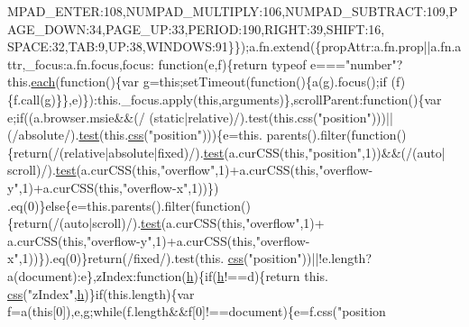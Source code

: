 \begin{DoxyCode}
      MPAD\_ENTER:108,NUMPAD\_MULTIPLY:106,NUMPAD\_SUBTRACT:109,PAGE\_DOWN:34,PAGE\_UP:33,PERIOD:190,RIGHT:39,SHIFT:16,
      SPACE:32,TAB:9,UP:38,WINDOWS:91\}\});a.fn.extend(\{propAttr:a.fn.prop||a.fn.attr,\_focus:a.fn.focus,focus:\textcolor{keyword}{
      function}(e,f)\{\textcolor{keywordflow}{return} typeof e===\textcolor{stringliteral}{"number"}?this.\hyperlink{jquery_8js_a871ff39db627c54c710a3e9909b8234c}{each}(\textcolor{keyword}{function}()\{var g=\textcolor{keyword}{this};setTimeout(\textcolor{keyword}{function}()\{a(g).focus();\textcolor{keywordflow}{if}
      (f)\{f.call(g)\}\},e)\}):this.\_focus.apply(\textcolor{keyword}{this},arguments)\},scrollParent:\textcolor{keyword}{function}()\{var e;\textcolor{keywordflow}{if}((a.browser.msie&&(/
      (\textcolor{keyword}{static}|relative)/).test(\textcolor{keyword}{this}.css(\textcolor{stringliteral}{"position"})))||(/absolute/).\hyperlink{inv__mpu_8c_a1e8f8b1ef7fb2c429e1ce7c2f9985530}{test}(this.\hyperlink{jquery_8js_a89ad527fcd82c01ebb587332f5b4fcd4}{css}(\textcolor{stringliteral}{"position"})))\{e=this.
      parents().filter(\textcolor{keyword}{function}()\{\textcolor{keywordflow}{return}(/(relative|absolute|fixed)/).\hyperlink{inv__mpu_8c_a1e8f8b1ef7fb2c429e1ce7c2f9985530}{test}(a.curCSS(\textcolor{keyword}{this},\textcolor{stringliteral}{"position"},1))&&(/(\textcolor{keyword}{auto}|
      scroll)/).\hyperlink{inv__mpu_8c_a1e8f8b1ef7fb2c429e1ce7c2f9985530}{test}(a.curCSS(\textcolor{keyword}{this},\textcolor{stringliteral}{"overflow"},1)+a.curCSS(\textcolor{keyword}{this},\textcolor{stringliteral}{"overflow-y"},1)+a.curCSS(\textcolor{keyword}{this},\textcolor{stringliteral}{"overflow-x"},1))\})
      .eq(0)\}\textcolor{keywordflow}{else}\{e=this.parents().filter(\textcolor{keyword}{function}()\{\textcolor{keywordflow}{return}(/(\textcolor{keyword}{auto}|scroll)/).\hyperlink{inv__mpu_8c_a1e8f8b1ef7fb2c429e1ce7c2f9985530}{test}(a.curCSS(\textcolor{keyword}{this},\textcolor{stringliteral}{"overflow"},1)+
      a.curCSS(\textcolor{keyword}{this},\textcolor{stringliteral}{"overflow-y"},1)+a.curCSS(\textcolor{keyword}{this},\textcolor{stringliteral}{"overflow-x"},1))\}).eq(0)\}\textcolor{keywordflow}{return}(/fixed/).test(this.
      \hyperlink{jquery_8js_a89ad527fcd82c01ebb587332f5b4fcd4}{css}(\textcolor{stringliteral}{"position"}))||!e.length?a(document):e\},zIndex:\textcolor{keyword}{function}(\hyperlink{all__1a_8js_aebecdaf2444e2be39f4804412d6a3bf8}{h})\{\textcolor{keywordflow}{if}(\hyperlink{all__1a_8js_aebecdaf2444e2be39f4804412d6a3bf8}{h}!==d)\{\textcolor{keywordflow}{return} this.
      \hyperlink{jquery_8js_a89ad527fcd82c01ebb587332f5b4fcd4}{css}(\textcolor{stringliteral}{"zIndex"},\hyperlink{all__1a_8js_aebecdaf2444e2be39f4804412d6a3bf8}{h})\}\textcolor{keywordflow}{if}(this.length)\{var f=a(\textcolor{keyword}{this}[0]),e,g;\textcolor{keywordflow}{while}(f.length&&f[0]!==document)\{e=f.css(\textcolor{stringliteral}{"position
}
\end{DoxyCode}

